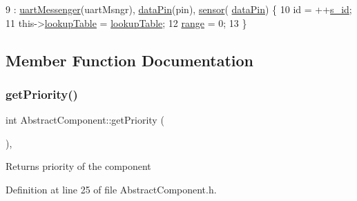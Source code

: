 \begin{DoxyCode}
9                                                                                                            
            : \hyperlink{class_i_r_sensor_analog_abdd70ea1abffd1323989af062dab0aeb}{uartMessenger}(uartMsngr), \hyperlink{class_i_r_sensor_analog_a248c6a3f0a6a4e4867fd70c0ac0b3d76}{dataPin}(pin), \hyperlink{class_i_r_sensor_analog_a90a5052f0d0f71bf2518fac4b5dd9dc0}{sensor}(
      \hyperlink{class_i_r_sensor_analog_a248c6a3f0a6a4e4867fd70c0ac0b3d76}{dataPin}) \{
10     \textcolor{keywordtype}{id} = ++\hyperlink{class_abstract_component_a99ce3e5fe7d73dac569b874c15fcaf0d}{s\_id};
11     this->\hyperlink{class_i_r_sensor_analog_a981d91e0de8f658d5c15ac5bfbe8ed6c}{lookupTable} = \hyperlink{class_i_r_sensor_analog_a981d91e0de8f658d5c15ac5bfbe8ed6c}{lookupTable};
12     \hyperlink{class_i_r_sensor_analog_a7463c4bbf714764667ac9d7527ced012}{range} = 0;
13 \}
\end{DoxyCode}


\subsection{Member Function Documentation}
\mbox{\label{class_abstract_component_ac0b440d1d642ff1292ec3c544d75a8f1}} 
\subsubsection{\texorpdfstring{get\+Priority()}{getPriority()}}
{\footnotesize\ttfamily int Abstract\+Component\+::get\+Priority (\begin{DoxyParamCaption}{ }\end{DoxyParamCaption})\hspace{0.3cm}{\ttfamily [inline]}, {\ttfamily [inherited]}}

\begin{DoxyReturn}{Returns}
priority of the component 
\end{DoxyReturn}


Definition at line 25 of file Abstract\+Component.\+h.


